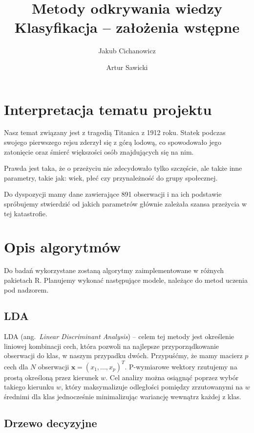 \documentclass{article}
\newcommand{\TODO}[1]{\textcolor{blue}{TODO: #1}}
\newcommand{\ang}[1]{ang.~{\itshape #1}}
\begin{document}
\title{Metody odkrywania wiedzy \\%
{\large Klasyfikacja -- założenia wstępne} }

\author{Jakub Cichanowicz \and Artur Sawicki}

\maketitle

\section{Interpretacja tematu projektu}
Nasz temat związany jest z tragedią Titanica z 1912 roku. Statek podczas swojego pierwszego rejsu zderzył się z górą lodową, co spowodowało jego zatonięcie oraz śmierć większości osób znajdujących się na nim.

Prawda jest taka, że o przeżyciu nie zdecydowało tylko szczęście, ale także inne parametry, takie jak: wiek, płeć czy przynależność do grupy społecznej.

Do dyspozycji mamy dane zawierające 891 obserwacji i na ich podstawie spróbujemy stwierdzić od jakich parametrów głównie zależała szansa przeżycia w tej katastrofie.

\section{Opis algorytmów}
Do badań wykorzystane zostaną algorytmy zaimplementowane w różnych pakietach R. Planujemy wykonać następujące modele, należące do metod uczenia pod nadzorem.

\subsection{LDA}
LDA (\ang{Linear Discriminant Analysis}) -- celem tej metody jest określenie liniowej kombinacji cech, która pozwoli na najlepsze przyporządkowanie obserwacji do klas, w naszym przypadku dwóch. Przypuśćmy, że mamy macierz $p$ cech dla $N$ obserwacji $\mathbf{x}=(x_{1},...,x_{p})^{T}$. P-wymiarowe wektory rzutujemy na prostą określoną przez kierunek $w$. Cel analizy można osiągnąć poprzez wybór takiego kierunku $w$, który maksymalizuje odległości pomiędzy zrzutowanymi na $w$ średnimi dla klas jednocześnie minimalizując wariancję wewnątrz każdej z klas.

\subsection{Drzewo decyzyjne}
\end{document}
